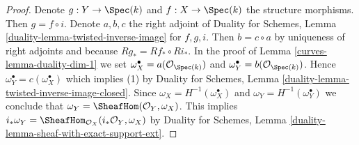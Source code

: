 \begin{proof}

Denote $g : Y \to \Spec(k)$ and $f : X \to \Spec(k)$ the structure morphisms.
Then $g = f \circ i$. Denote $a, b, c$ the right adjoint of
Duality for Schemes, Lemma
\ref{duality-lemma-twisted-inverse-image} for $f, g, i$.
Then $b = c \circ a$ by uniqueness of right adjoints
and because $Rg_* = Rf_* \circ Ri_*$.
In the proof of Lemma \ref{curves-lemma-duality-dim-1}
we set
$\omega_X^\bullet = a(\mathcal{O}_{\Spec(k)})$ and
$\omega_Y^\bullet = b(\mathcal{O}_{\Spec(k)})$.
Hence $\omega_Y^\bullet = c(\omega_X^\bullet)$
which implies (1) by Duality for Schemes, Lemma
\ref{duality-lemma-twisted-inverse-image-closed}.
Since $\omega_X = H^{-1}(\omega_X^\bullet)$ and
$\omega_Y = H^{-1}(\omega_Y^\bullet)$ we conclude that
$\omega_Y = \SheafHom(\mathcal{O}_Y, \omega_X)$.
This implies
$i_*\omega_Y = \SheafHom_{\mathcal{O}_X}(i_*\mathcal{O}_Y, \omega_X)$
by Duality for Schemes, Lemma
\ref{duality-lemma-sheaf-with-exact-support-ext}.
\end{proof}

